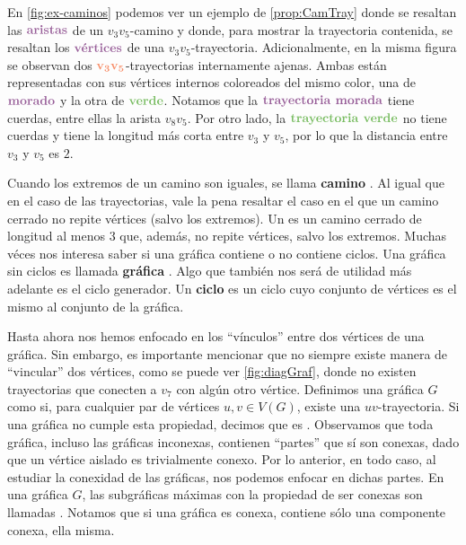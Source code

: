 En \cref{fig:ex-caminos} podemos ver un ejemplo de \cref{prop:CamTray} donde se
resaltan las ${\color{morado}\bf aristas}$ de un $v_3 v_5$-camino y donde, para
mostrar la trayectoria contenida, se resaltan los
${\color{morado}\textbf{v\'ertices}}$ de una $v_3 v_5$-trayectoria.
Adicionalmente, en la misma figura se observan dos ${\color{coral}\bf v_3
v_5}$-trayectorias internamente ajenas. Ambas est\'an representadas con sus
v\'ertices internos coloreados del mismo color, una de ${\color{morado}\bf
morado}$ y la otra de ${\color{verde}\bf verde}$. Notamos que la
${\color{morado}\textbf{trayectoria morada}}$ tiene cuerdas, entre ellas la
arista $v_8v_5$. Por otro lado, la ${\color{verde}\textbf{trayectoria verde}}$
no tiene cuerdas y tiene la longitud m\'as corta entre $v_3$ y $v_5$, por lo que
la distancia entre $v_3$ y $v_5$ es $2$.

Cuando los extremos de un camino son iguales, se llama \textbf{camino}
. Al igual que en el caso de las trayectorias, vale
la pena resaltar el caso en el que un camino cerrado no repite v\'ertices (salvo
los extremos). Un  es un camino cerrado de longitud al menos $3$
que, adem\'as, no repite v\'ertices, salvo los extremos.  Muchas v\'eces nos
interesa saber si una gr\'afica contiene o no contiene ciclos. Una gr\'afica sin
ciclos es llamada \textbf{gr\'afica} . Algo que
tambi\'en nos ser\'a de utilidad m\'as adelante es el ciclo generador. Un
\textbf{ciclo} es un ciclo cuyo conjunto de
v\'ertices es el mismo al conjunto de la gr\'afica.
   
Hasta ahora nos hemos enfocado en los ``v\'inculos'' entre dos v\'ertices de una
gr\'afica. Sin embargo, es importante mencionar que no siempre existe manera de
``vincular'' dos v\'ertices, como se puede ver \cref{fig:diagGraf}, donde no
existen trayectorias que conecten a $v_7$ con alg\'un otro v\'ertice.  Definimos
una gr\'afica $G$ como  si,
para cualquier par de v\'ertices $u,v \in V(G)$, existe una $uv$-trayectoria. Si
una gr\'afica no cumple esta propiedad, decimos que es
. Observamos que toda gr\'afica, incluso las
gr\'aficas inconexas, contienen ``partes'' que s\'i son conexas, dado que un
v\'ertice aislado es trivialmente conexo. Por lo anterior, en todo caso, al
estudiar la conexidad de las gr\'aficas, nos podemos enfocar en dichas partes.
En una gr\'afica $G$, las subgr\'aficas m\'aximas con la propiedad de ser
conexas son llamadas .
Notamos que si una gr\'afica es conexa, contiene s\'olo una componente conexa,
ella misma. 

